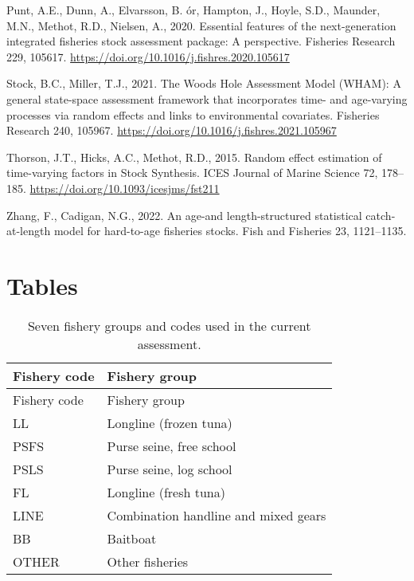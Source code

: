 \documentclass[
]{scrartcl}
\newlength{\cslhangindent}
\newenvironment{CSLReferences}[2] %
 {\begin{list}{}{%
  \setlength{\itemindent}{0pt}
  \setlength{\leftmargin}{0pt}
  \setlength{\parsep}{0pt}
  \ifodd #1
   \setlength{\leftmargin}{\cslhangindent}
   \setlength{\itemindent}{-1\cslhangindent}
  \fi
  \setlength{\itemsep}{#2\baselineskip}}}
 {\end{list}}
\begin{document}
\begin{CSLReferences}{1}{0}
Punt, A.E., Dunn, A., Elvarsson, B. ór, Hampton, J., Hoyle, S.D.,
Maunder, M.N., Methot, R.D., Nielsen, A., 2020. Essential features of
the next-generation integrated fisheries stock assessment package: {A}
perspective. Fisheries Research 229, 105617.
\url{https://doi.org/10.1016/j.fishres.2020.105617}

Stock, B.C., Miller, T.J., 2021. The {Woods Hole Assessment Model}
({WHAM}): {A} general state-space assessment framework that incorporates
time- and age-varying processes via random effects and links to
environmental covariates. Fisheries Research 240, 105967.
\url{https://doi.org/10.1016/j.fishres.2021.105967}

Thorson, J.T., Hicks, A.C., Methot, R.D., 2015. Random effect estimation
of time-varying factors in {Stock Synthesis}. ICES Journal of Marine
Science 72, 178--185. \url{https://doi.org/10.1093/icesjms/fst211}

Zhang, F., Cadigan, N.G., 2022. An age-and length-structured statistical
catch-at-length model for hard-to-age fisheries stocks. Fish and
Fisheries 23, 1121--1135.

\end{CSLReferences}

\newpage{}

\section{Tables}\label{tables}

\begin{longtable}[]{@{}ll@{}}
\caption{Seven fishery groups and codes used in the current
assessment.}\label{tbl-fishery-codes}\tabularnewline
\toprule\noalign{}
Fishery code & Fishery group \\
\midrule\noalign{}
\endfirsthead
\toprule\noalign{}
Fishery code & Fishery group \\
\midrule\noalign{}
\endhead
\bottomrule\noalign{}
\endlastfoot
LL & Longline (frozen tuna) \\
PSFS & Purse seine, free school \\
PSLS & Purse seine, log school \\
FL & Longline (fresh tuna) \\
LINE & Combination handline and mixed gears \\
BB & Baitboat \\
OTHER & Other fisheries \\
\end{longtable}
\end{document}
